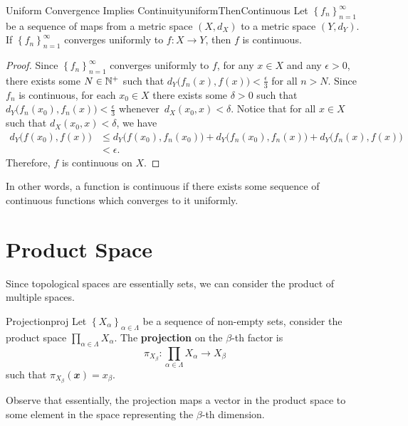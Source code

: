 \documentclass[math]{amznotes}
\theoremstyle{remark}
\begin{document}
\begin{probox}{Uniform Convergence Implies Continuity}{uniformThenContinuous}
    Let $\left\{f_n\right\}_{n = 1}^{\infty}$ be a sequence of maps from a metric space $\left(X, d_X\right)$ to a metric space $\left(Y, d_Y\right)$. If $\left\{f_n\right\}_{n = 1}^{\infty}$ converges uniformly to $f \colon X \to Y$, then $f$ is continuous.
    \tcblower
    \begin{proof}
        Since $\left\{f_n\right\}_{n = 1}^{\infty}$ converges uniformly to $f$, for any $x \in X$ and any $\epsilon > 0$, there exists some $N \in \mathbb{N}^+$ such that $d_Y\bigl(f_n\left(x\right), f\left(x\right)\bigr) < \frac{\epsilon}{3}$ for all $n > N$. Since $f_n$ is continuous, for each $x_0 \in X$ there exists some $\delta > 0$ such that $d_Y\bigl(f_n\left(x_0\right), f_n\left(x\right)\bigr) < \frac{\epsilon}{3}$ whenever~$d_X\left(x_0, x\right) < \delta$. Notice that for all $x \in X$ such that $d_X\left(x_0, x\right) < \delta$, we have 
        \begin{align*}
            d_Y\bigl(f\left(x_0\right), f\left(x\right)\bigr) & \leq d_Y\bigl(f\left(x_0\right), f_n\left(x_0\right)\bigr)  + d_Y\bigl(f_n\left(x_0\right), f_n\left(x\right)\bigr) + d_Y\bigl(f_n\left(x\right), f\left(x\right)\bigr) \\
            & < \epsilon.
        \end{align*}
        Therefore, $f$ is continuous on $X$.
    \end{proof}
\end{probox}
In other words, a function is continuous if there exists some sequence of continuous functions which converges to it uniformly.
\section{Product Space}
Since topological spaces are essentially sets, we can consider the product of multiple spaces.
\begin{dfnbox}{Projection}{proj}
    Let $\left\{X_{\alpha}\right\}_{\alpha \in \Lambda}$ be a sequence of non-empty sets, consider the product space $\prod_{\alpha \in \Lambda}X_{\alpha}$. The {\color{red} \textbf{projection}} on the $\beta$-th factor is 
    \begin{equation*}
        \pi_{X_{\beta}} \colon \prod_{\alpha \in \Lambda}X_{\alpha} \to X_{\beta}
    \end{equation*}
    such that $\pi_{X_{\beta}}\left(\mathbfit{x}\right) = x_{\beta}$.
\end{dfnbox}
Observe that essentially, the projection maps a vector in the product space to some element in the space representing the $\beta$-th dimension.
\end{document}
